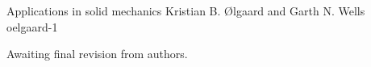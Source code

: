               {Applications in solid mechanics}
              {Kristian B. {\O}lgaard and Garth N. Wells}
              {oelgaard-1}

Awaiting final revision from authors.
